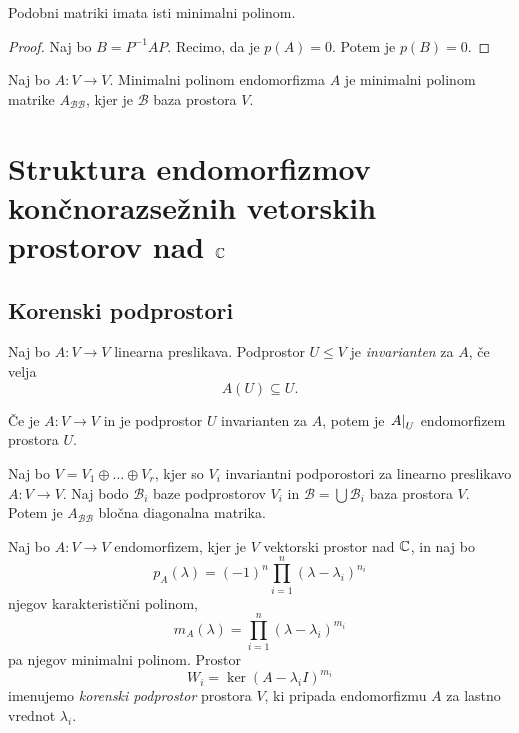 \documentclass[12pt, a4paper]{article}
\begin{document}
\begin{trditev}
Podobni matriki imata isti minimalni polinom.
\end{trditev}

\begin{proof}
Naj bo $B=P^{-1}AP$. Recimo, da je $p(A)=0$. Potem je $p(B)=0$.
\end{proof}

\begin{definicija}
Naj bo $A\colon V\to V$. Minimalni polinom endomorfizma $A$ je minimalni polinom matrike $A_{\mathcal{BB}}$, kjer je $\mathcal{B}$ baza prostora $V$.
\end{definicija}

\newpage

\section{Struktura endomorfizmov končnorazsežnih vetorskih prostorov nad $\mathbb{C}$}

\subsection{Korenski podprostori}

\begin{definicija}
Naj bo $A\colon V\to V$ linearna preslikava. Podprostor $U\leq V$ je \emph{invarianten} za $A$, če velja
\[
A(U)\subseteq U.
\]
\end{definicija}

\begin{opomba}
Če je $A\colon V\to V$ in je podprostor $U$ invarianten za $A$, potem je $\left. A\right|_{U}^{}$ endomorfizem prostora $U$.
\end{opomba}

\begin{trditev}
Naj bo $V=V_1\oplus\dots\oplus V_r$, kjer so $V_i$ invariantni podporostori za linearno preslikavo $A\colon V\to V$. Naj bodo $\mathcal{B}_i$ baze podprostorov $V_i$ in $\mathcal{B}=\bigcup\mathcal{B}_i$ baza prostora $V$. Potem je $A_{\mathcal{BB}}$ bločna diagonalna matrika.
\end{trditev}

\obvs

\begin{definicija}
Naj bo $A\colon V\to V$ endomorfizem, kjer je $V$ vektorski prostor nad $\mathbb{C}$, in naj bo
\[
p_A(\lambda)=(-1)^n\prod_{i=1}^n(\lambda-\lambda_i)^{n_i}
\]
njegov karakteristični polinom,
\[
m_A(\lambda)=\prod_{i=1}^n(\lambda-\lambda_i)^{m_i}
\]
pa njegov minimalni polinom. Prostor
\[
W_i=\ker(A-\lambda_i I)^{m_i}
\]
imenujemo \emph{korenski podprostor} prostora $V$, ki pripada endomorfizmu $A$ za lastno vrednot $\lambda_i$.
\end{definicija}
\end{document}

